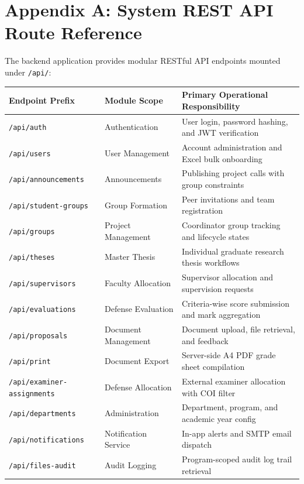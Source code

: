 \section*{Appendix A: System REST API Route Reference}

The backend application provides modular RESTful API endpoints mounted under \texttt{/api/}:

\begin{table}[H]
\centering
\small
\begin{tabularx}{\textwidth}{@{}l p{4.5cm} X@{}}
\toprule
\textbf{Endpoint Prefix} & \textbf{Module Scope} & \textbf{Primary Operational Responsibility} \\
\midrule
\texttt{/api/auth}           & Authentication & User login, password hashing, and JWT verification \\
\texttt{/api/users}          & User Management & Account administration and Excel bulk onboarding \\
\texttt{/api/announcements}  & Announcements & Publishing project calls with group constraints \\
\texttt{/api/student-groups} & Group Formation & Peer invitations and team registration \\
\texttt{/api/groups}         & Project Management & Coordinator group tracking and lifecycle states \\
\texttt{/api/theses}         & Master Thesis & Individual graduate research thesis workflows \\
\texttt{/api/supervisors}    & Faculty Allocation & Supervisor allocation and supervision requests \\
\texttt{/api/evaluations}    & Defense Evaluation & Criteria-wise score submission and mark aggregation \\
\texttt{/api/proposals}      & Document Management & Document upload, file retrieval, and feedback \\
\texttt{/api/print}          & Document Export & Server-side A4 PDF grade sheet compilation \\
\texttt{/api/examiner-assignments} & Defense Allocation & External examiner allocation with COI filter \\
\texttt{/api/departments}    & Administration & Department, program, and academic year config \\
\texttt{/api/notifications}  & Notification Service & In-app alerts and SMTP email dispatch \\
\texttt{/api/files-audit}    & Audit Logging & Program-scoped audit log trail retrieval \\
\bottomrule
\end{tabularx}
\end{table}


